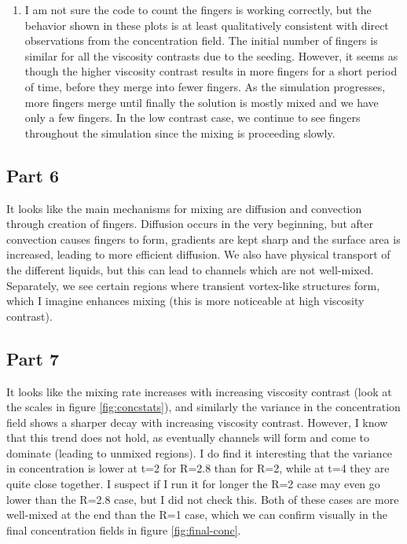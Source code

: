 \documentclass{article}
\begin{document}
\begin{enumerate}
\item I am not sure the code to count the fingers is working correctly, but the behavior shown in these plots is at least qualitatively consistent with direct observations from the concentration field.
The initial number of fingers is similar for all the viscosity contrasts due to the seeding.
However, it seems as though the higher viscosity contrast results in more fingers for a short period of time, before they merge into fewer fingers.
As the simulation progresses, more fingers merge until finally the solution is mostly mixed and we have only a few fingers.
In the low contrast case, we continue to see fingers throughout the simulation since the mixing is proceeding slowly.

\end{enumerate}

\subsection{Part 6}
It looks like the main mechanisms for mixing are diffusion and convection through creation of fingers.
Diffusion occurs in the very beginning, but after convection causes fingers to form, gradients are kept sharp and the surface area is increased, leading to more efficient diffusion.
We also have physical transport of the different liquids, but this can lead to channels which are not well-mixed.
Separately, we see certain regions where transient vortex-like structures form, which I imagine enhances mixing (this is more noticeable at high viscosity contrast).

\subsection{Part 7}
It looks like the mixing rate increases with increasing viscosity contrast (look at the scales in figure \ref{fig:concstats}), and similarly the variance in the concentration field shows a sharper decay with increasing viscosity contrast.
However, I know that this trend does not hold, as eventually channels will form and come to dominate (leading to unmixed regions).
I do find it interesting that the variance in concentration is lower at t=2 for R=2.8 than for R=2, while at t=4 they are quite close together.
I suspect if I run it for longer the R=2 case may even go lower than the R=2.8 case, but I did not check this.
Both of these cases are more well-mixed at the end than the R=1 case, which we can confirm visually in the final concentration fields in figure \ref{fig:final-conc}.
\end{document}
